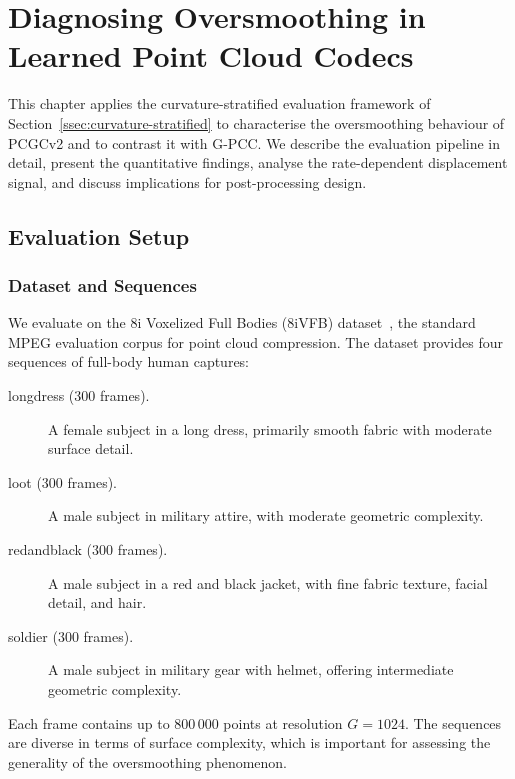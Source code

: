 \chapter{Diagnosing Oversmoothing in Learned Point Cloud Codecs}
\label{ch:oversmoothing}

This chapter applies the curvature-stratified evaluation framework of
Section~\ref{ssec:curvature-stratified} to characterise the oversmoothing
behaviour of PCGCv2 and to contrast it with G-PCC.
We describe the evaluation pipeline in detail, present the quantitative
findings, analyse the rate-dependent displacement signal, and discuss
implications for post-processing design.

\section{Evaluation Setup}
\label{sec:eval-setup}

\subsection{Dataset and Sequences}

We evaluate on the 8i Voxelized Full Bodies (8iVFB) dataset~\cite{8ivfb},
the standard MPEG evaluation corpus for point cloud compression.
The dataset provides four sequences of full-body human captures:

\begin{description}
  \item[longdress (300 frames).] A female subject in a long dress, primarily
    smooth fabric with moderate surface detail.
  \item[loot (300 frames).] A male subject in military attire, with moderate
    geometric complexity.
  \item[redandblack (300 frames).] A male subject in a red and black jacket,
    with fine fabric texture, facial detail, and hair.
  \item[soldier (300 frames).] A male subject in military gear with helmet,
    offering intermediate geometric complexity.
\end{description}

Each frame contains up to 800\,000 points at resolution $G = 1024$.
The sequences are diverse in terms of surface complexity, which is important
for assessing the generality of the oversmoothing phenomenon.

